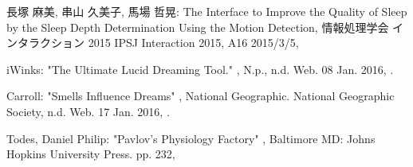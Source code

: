 \begin{bib}[100]
\begin{flushleft}
  長塚 麻美, 串山 久美子, 馬場 哲晃:
  \newblock  The Interface to Improve the Quality of Sleep by the Sleep Depth Determination Using the Motion Detection,
  \newblock 情報処理学会 インタラクション 2015 IPSJ Interaction 2015,
  \newblock  A16 2015/3/5,
\end{flushleft}

\begin{flushleft}
iWinks:
 \newblock  "The Ultimate Lucid Dreaming Tool." ,
  \newblock N.p., n.d. Web. 08 Jan. 2016,
  .
\end{flushleft}

\begin{flushleft}
Carroll:
 \newblock  "Smells Influence Dreams" ,
  \newblock National Geographic. National Geographic Society, n.d. Web. 17 Jan. 2016,
  .
\end{flushleft}

\begin{flushleft}
Todes, Daniel Philip:
 \newblock  "Pavlov's Physiology Factory" ,
  \newblock Baltimore MD: Johns Hopkins University Press. pp. 232,
\end{flushleft}

\end{bib}